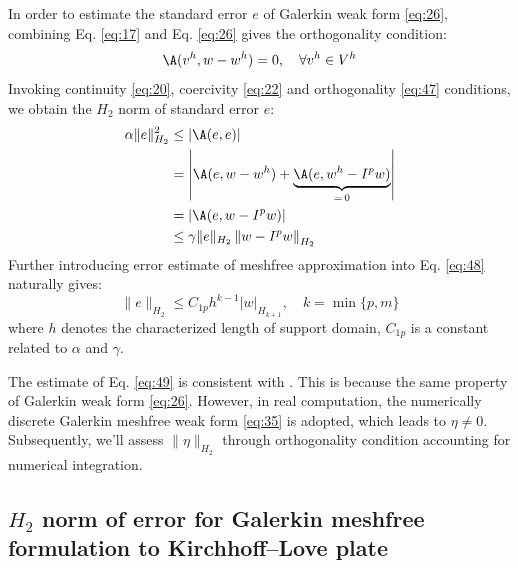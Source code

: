 In order to estimate the standard error $e$ of Galerkin weak form \eqref{eq:26}, combining Eq. \eqref{eq:17} and Eq. \eqref{eq:26} gives the orthogonality condition:
\begin{equation}\label{eq:47}
\A(v^{h},w-w^{h})=0,\quad \forall v^{h}\in V^{h}
\end{equation}
Invoking continuity \eqref{eq:20}, coercivity \eqref{eq:22} and orthogonality \eqref{eq:47} conditions, we obtain the $H_2$ norm of standard error $e$:
\begin{equation}\label{eq:48}
\begin{aligned}
\alpha\|e\|^{2}_{H_2}&\le\left|\A(e,e)\right|\\
&=\left|\A(e,w-w^{h})+\underbrace{\A(e,w^{h}-I^{p}w)}_{=\,0}\right|\\
&=\left|\A(e,w-I^{p}w)\right|\\
&\le\gamma\|e\|_{H_2}\left\|w-I^{p}w\right\|_{H_2}
\end{aligned}
\end{equation}
Further introducing error estimate of meshfree approximation into Eq. \eqref{eq:48} naturally gives:
\begin{equation}\label{eq:49}
\|e\|_{H_2}\le C_{1p}h^{k-1}|w|_{H_{k+1}},\quad k=\min\{p,m\}
\end{equation}
where $h$ denotes the characterized length of support domain, $C_{1p}$ is a constant related to $\alpha$ and $\gamma$.

The estimate of Eq. \eqref{eq:49} is consistent with \cite{ref46}.
This is because the same property of Galerkin weak form \eqref{eq:26}.
However, in real computation, the numerically discrete Galerkin meshfree weak form \eqref{eq:35} is adopted, which leads to $\eta\neq0$.
Subsequently, we'll assess $\|\eta\|_{H_2}$ through orthogonality condition accounting for numerical integration.

\subsection{$H_2$ norm of error for Galerkin meshfree formulation to Kirchhoff--Love plate}\label{sec:h2error}


